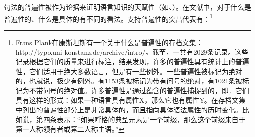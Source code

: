 句法的普遍性被作为论据来证明语言知识的天赋性（如\citealp[]{Chomsky98a-u}、\citealp[--238]{Pinker94a}）。在文献中，对于什么是普遍性的、什么是具体的有不同的看法。支持普遍性的突出代表有：\footnote{
Frans Plank在康斯坦斯有一个关于什么是普遍性的存档文集\citep{PF2000a}：\url{http://typo.uni-konstanz.de/archive/intro/}。截至，一共有2029条记录。这些记录根据它们的质量来进行标注，结果发现，许多的普遍性具有统计上的普遍性，它们适用于绝大多数语言，但是有一些例外。一些普遍性被标记为绝对的，也就说，极少有例外。有1153条被标记为带有问号的绝对，有1021条被标记为不带问号的绝对值。许多普遍性是通过蕴含的普遍性捕捉到的，即，它们具有这样的形式：如果一种语言具有属性X，那么它也有属性Y。在存档文集中列出的普遍性部分上是非常具体的，而且指向具体语法属性的历时变化。比如说，第四条表示：“如果呼格的典型元素是一个前缀，那么这个前缀来自于第一人称领有者或第二人称主语。”
}\nocite{Harbour2011a}

